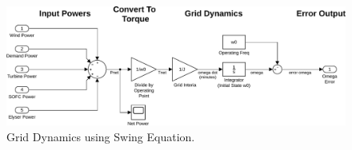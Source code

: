 \begin{figure}[p]
\centering
        \includegraphics[scale=0.65]{images/plant2/grid.pdf}
    \caption{Grid Dynamics using Swing Equation.}
        \label{fig:grid}
\end{figure}



